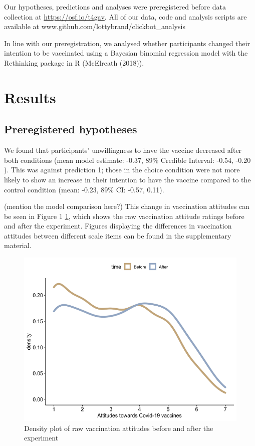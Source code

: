 \documentclass[
  english,
  ,jou,floatsintext]{apa6}
\begin{document}
Our hypotheses, predictions and analyses were preregistered before data collection at \url{https://osf.io/t4gav}. All of our data, code and analysis scripts are available at www.github.com/lottybrand/clickbot\_analysis

In line with our preregistration, we analysed whether participants changed their intention to be vaccinated using a Bayesian binomial regression model with the Rethinking package in R (McElreath (2018)).

\hypertarget{results}{%
\section{Results}\label{results}}

\hypertarget{preregistered-hypotheses}{%
\subsection{Preregistered hypotheses}\label{preregistered-hypotheses}}

We found that participants' unwillingness to have the vaccine decreased after both conditions (mean model estimate: -0.37, 89\% Credible Interval: -0.54, -0.20 ). This was against prediction 1; those in the choice condition were not more likely to show an increase in their intention to have the vaccine compared to the control condition (mean: -0.23, 89\% CI: -0.57, 0.11).

(mention the model comparison here?) This change in vaccination attitudes can be seen in Figure 1 \ref{fig:figure1}, which shows the raw vaccination attitude ratings before and after the experiment. Figures displaying the differences in vaccination attitudes between different scale items can be found in the supplementary material.

\begin{figure}

{\centering \includegraphics[width=0.75\linewidth]{../plots/raw_density} 

}

\caption{Density plot of raw vaccination attitudes before and after the experiment}\label{fig:figure1}
\end{figure}
\end{document}
